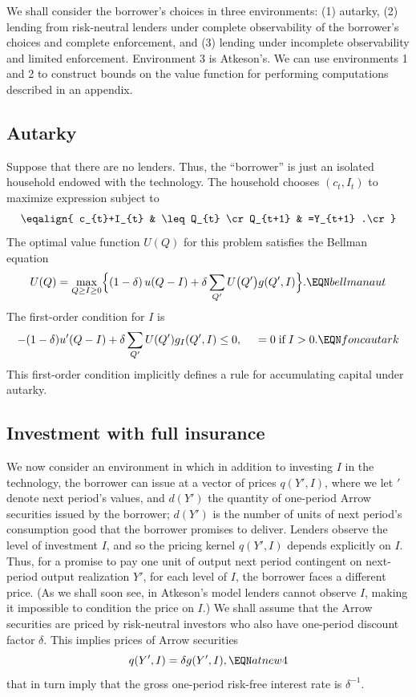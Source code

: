 We shall consider the borrower's choices in three environments: (1)
autarky, (2) lending from risk-neutral lenders under complete observability
of the borrower's choices and complete enforcement,  and (3) lending
under incomplete observability and  limited enforcement. Environment
3 is Atkeson's.
 We  can use environments 1 and 2 to construct
bounds on the value function for performing computations described
in an appendix.

\subsection{Autarky}

Suppose that there are no lenders.  Thus, the ``borrower'' is
just an isolated household endowed with the technology. The
household chooses $(c_{t},I_{t})$ to maximize expression
 subject to
$$\eqalign{ c_{t}+I_{t} & \leq Q_{t}  \cr
 Q_{t+1} & =Y_{t+1} .\cr} $$
The optimal  value function $U(Q)$  for this problem  satisfies
the Bellman equation %
$$U(Q)=\max_{Q\geq I \geq 0}\Bigl\{ (1-\delta)\,
u(Q-I)+\delta \sum_{Q'} U\bigl(Q^{\prime}\bigr)g(Q^{\prime},I)
    \Bigr\}.
 \EQN bellmanaut $$
The first-order condition for $I$ is
$$ -(1-\delta) u'(Q-I) + \delta \sum_{Q'} U(Q') g_I(Q',I)
                                      \leq 0, \hskip.5cm = 0 \;\hbox{\rm if}\; I>0.
   \EQN foncautark $$
This first-order condition implicitly defines a rule for
accumulating capital under autarky.

\subsection{Investment with full insurance}
We now consider an environment in which in addition
to investing $I$ in the technology, the borrower
can issue  at a vector of prices $q(Y',I)$, where
we let $'$ denote next period's values, and $d(Y')$ the
quantity of one-period  Arrow securities issued by the borrower;
$d(Y')$ is the number of units of next period's consumption
good that the borrower promises to deliver.
Lenders observe the level of investment $I$, and so the pricing kernel
$q(Y',I)$ depends explicitly on $I$.  Thus, for  a promise to pay
one unit of output next period contingent on
next-period output realization
$Y'$, for each level of $I$, the borrower faces a different price.
(As we shall soon see,
in Atkeson's model  lenders cannot observe $I$, making it impossible
to condition the price on $I$.)
We shall assume that the Arrow securities are priced by
 risk-neutral investors who also have
 one-period discount factor $\delta$.
This implies   prices
of Arrow securities
$$ q(Y',I) = \delta g(Y', I),  \EQN atnew4 $$
that in turn imply that the
gross one-period risk-free interest rate is $\delta^{-1}$.

